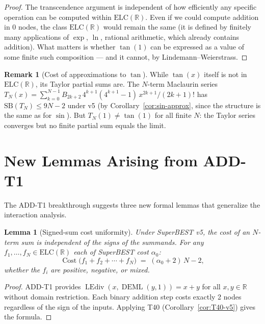\documentclass[12pt,a4paper]{article}
\newtheorem{lemma}[theorem]{Lemma}
\theoremstyle{definition}
\newtheorem{remark}[theorem]{Remark}
\newcommand{\DEML}{\operatorname{DEML}}
\newcommand{\LEdiv}{\operatorname{LEdiv}}
\newcommand{\SB}{\mathrm{SB}}
\newcommand{\ELC}{\mathrm{ELC}(\mathbb{R})}
\newcommand{\R}{\mathbb{R}}
\newcommand{\Cost}{\operatorname{Cost}}
\begin{document}
\begin{proof}
The transcendence argument is independent of how efficiently any specific
operation can be computed within $\ELC$.  Even if we could compute addition
in 0 nodes, the class $\ELC$ would remain the same (it is defined by finitely
many applications of $\exp$, $\ln$, rational arithmetic, which already contains
addition).  What matters is whether $\tan(1)$ can be expressed as a value of
some finite such composition --- and it cannot, by Lindemann--Weierstrass.
\end{proof}

\begin{remark}[Cost of approximations to $\tan$]
While $\tan(x)$ itself is not in $\ELC$, its Taylor partial sums are.
The $N$-term Maclaurin series
$T_N(x) = \sum_{k=0}^{N-1} B_{2k+2}\,4^{k+1}(4^{k+1}-1)\,x^{2k+1}/(2k+1)!$
has $\SB(T_N) \leq 9N-2$ under v5 (by Corollary~\ref{cor:sin-approx}, since
the structure is the same as for $\sin$).  But $T_N(1) \neq \tan(1)$ for
all finite $N$: the Taylor series converges but no finite partial sum equals
the limit.
\end{remark}

\section{New Lemmas Arising from ADD-T1}
\label{sec:new-lemmas}

The ADD-T1 breakthrough suggests three new formal lemmas that generalize
the interaction analysis.

\begin{lemma}[Signed-sum cost uniformity]
\label{lem:signed-sum}
Under SuperBEST v5, the cost of an $N$-term sum is independent of the signs
of the summands.  For any $f_1,\ldots,f_N \in \ELC$ each of SuperBEST cost $\alpha_0$:
\[
  \Cost\!\bigl(f_1 + f_2 + \cdots + f_N\bigr)
  \;=\; (\alpha_0 + 2)\,N - 2,
\]
whether the $f_i$ are positive, negative, or mixed.
\end{lemma}

\begin{proof}
ADD-T1 provides $\LEdiv(x,\DEML(y,1))=x+y$ for all $x,y\in\R$ without domain restriction.
Each binary addition step costs exactly 2 nodes regardless of the sign of the inputs.
Applying T40 (Corollary~\ref{cor:T40-v5}) gives the formula.
\end{proof}
\end{document}
